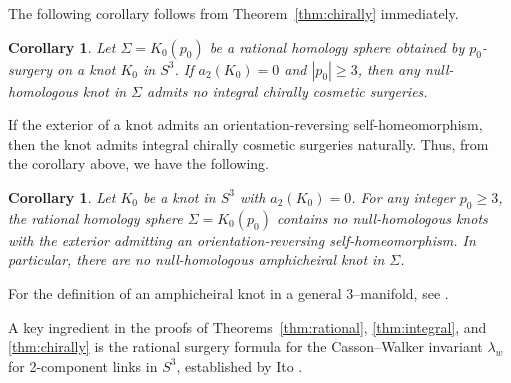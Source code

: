 \documentclass{amsart}
\newtheorem{corollary}[theorem]{Corollary}
\theoremstyle{remark}
\begin{document}
The following corollary follows from Theorem~\ref{thm:chirally}  immediately. 

\begin{corollary}\label{cor:1}
Let $\Sigma = K_0(p_0)$ be a rational homology sphere obtained by $p_0$-surgery on a knot $K_0$ in $S^3$. 
If $a_2(K_0)=0$ and $|p_0| \ge 3$, then any null-homologous knot in $\Sigma$ admits no integral chirally cosmetic surgeries. 
\end{corollary}

If the exterior of a knot admits an orientation-reversing self-homeomorphism, then the knot admits integral chirally cosmetic surgeries naturally. 
Thus, from the corollary above, we have the following. 

\begin{corollary}\label{cor:amphicheiral}
Let $K_0$ be a knot in $S^3$ with $a_2(K_0) = 0$. 
For any integer $p_0 \ge 3$, the rational homology sphere $\Sigma = K_0(p_0)$ contains no null-homologous knots with the exterior admitting an orientation-reversing self-homeomorphism. 
In particular, there are no null-homologous amphicheiral knot in $\Sigma$. 
\end{corollary}

For the definition of an amphicheiral knot in a general $3$--manifold, see \cite{IchiharaJongTaniyama}. 

A key ingredient in the proofs of Theorems~\ref{thm:rational}, \ref{thm:integral}, and \ref{thm:chirally} is the rational surgery formula for the Casson--Walker invariant $\lambda_w$ for 2-component links in $S^3$, established by Ito \cite[Theorem 1.5]{Ito2022}.

\bigskip 
\end{document}
